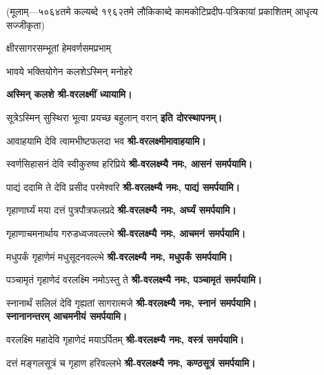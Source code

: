 \renewcommand{\devAya}{श्री-वरलक्ष्म्यै नमः,}
\centerline{\scriptsize (मूलाम्—५०६४तमे कल्यब्दे १९६२तमे लौकिकाब्दे कामकोटिप्रदीप-पत्रिकायां प्रकाशितम् आधृत्य सज्जीकृता)}
\begin{center}

{क्षीरसागरसम्भूतां हेमवर्णसमप्रभाम्}

{भावये भक्तियोगेन कलशेऽस्मिन् मनोहरे}

\textbf{अस्मिन् कलशे श्री-वरलक्ष्मीं ध्यायामि।}
\medskip

{सूत्रेऽस्मिन् सुस्थिरा भूत्वा प्रयच्छ बहुलान् वरान्}
\textbf{इति दोरस्थापनम्।}\medskip

{आवाहयामि देवि त्वामभीष्टफलदा भव}
\textbf{श्री-वरलक्ष्मीमावाहयामि।}

{स्वर्णसिहासनं देवि स्वीकुरुष्व हरिप्रिये}
\textbf{\devAya{} आसनं समर्पयामि।}

{पाद्यं ददामि ते देवि प्रसीद परमेश्वरि}
\textbf{\devAya{} पाद्यं समर्पयामि।}
\medskip

{गृहाणार्घ्यं मया दत्तं पुत्रपौत्रफलप्रदे}
\textbf{\devAya{} अर्घ्यं समर्पयामि।}
\medskip

{गृहाणाचमनार्थाय गरुडध्वजवल्लभे}
\textbf{\devAya{} आचमनं समर्पयामि।}
\medskip

{मधुपर्कं गृहाणेमं मधुसूदनवल्ल्भे}
\textbf{\devAya{} मधुपर्कं समर्पयामि।}
\medskip

{पञ्चामृतं गृहाणेदं वरलक्ष्मि नमोऽस्तु ते}
\textbf{\devAya{} पञ्चामृतं समर्पयामि।}
\medskip

{स्नानार्थं सलिलं देवि गृह्यतां सागरात्मजे}
\textbf{\devAya{} स्नानं समर्पयामि।\\
स्नानानन्तरम् आचमनीयं समर्पयामि।}
\medskip

{वरलक्ष्मि महादेवि गृहाणेदं मयाऽर्पितम्}
\textbf{\devAya{} वस्त्रं समर्पयामि।}
\medskip

{दत्तं मङ्गलसूत्रं च गृहाण हरिवल्लभे}
\textbf{\devAya{} कण्ठसूत्रं समर्पयामि।}
\medskip


\end{center}
